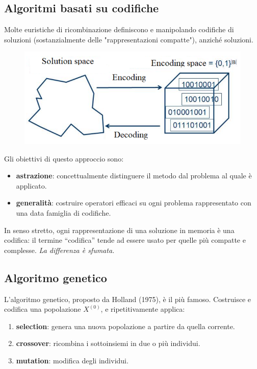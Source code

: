 \documentclass{article}
\begin{document}
\subsection{Algoritmi basati su codifiche}
Molte euristiche di ricombinazione definiscono e manipolando codifiche di soluzioni
(sostanzialmente delle "rappresentazioni compatte"), anziché soluzioni.
\begin{figure}[H]
    \centering
    \includegraphics[scale=0.5]{images/enc_based_algo.png}
\end{figure}
Gli obiettivi di questo approccio sono:
\begin{itemize}
    \item \textbf{astrazione}: concettualmente distinguere il metodo dal
    problema al quale è applicato.
    \item \textbf{generalità}: costruire operatori efficaci su ogni problema
    rappresentato con una data famiglia di codifiche.
\end{itemize}
In senso stretto, ogni rappresentazione di una soluzione in memoria è una codifica:
il termine “codifica” tende ad
essere usato per quelle più compatte e complesse. \textit{La differenza è sfumata.}

\subsection{Algoritmo genetico}
L'algoritmo genetico, proposto da Holland (1975), è il più famoso. Costruisce e
codifica una popolazione $X^{(0)}$, e ripetitivamente applica:
\begin{enumerate}
    \item \textbf{selection}: genera una nuova popolazione a partire da quella corrente.
    \item \textbf{crossover}: ricombina i sottoinsiemi in due o più individui.
    \item \textbf{mutation}: modifica degli individui.
\end{enumerate}
\end{document}
